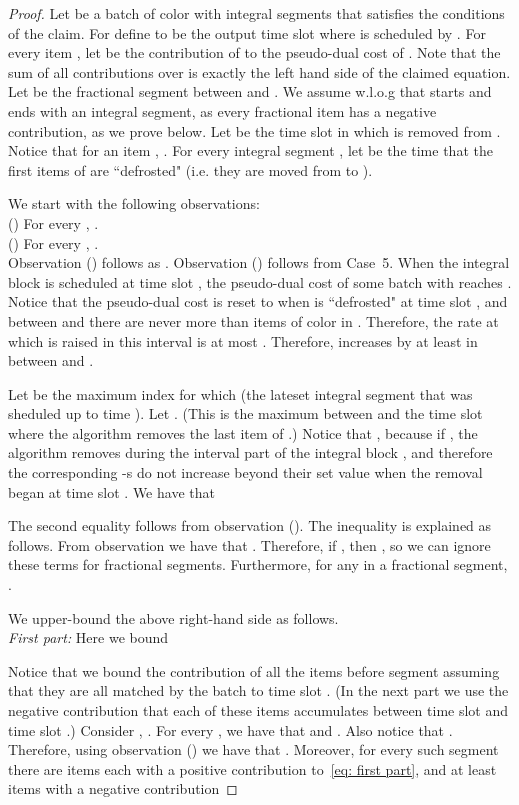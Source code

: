 \documentclass[12pt]{article}
\begin{document}
\begin{proof}
Let  be a batch of color  with  integral segments 
that satisfies the conditions of the claim. For  define 
to be the output time slot where  is scheduled by . For every item , let
 be the contribution of 
to the pseudo-dual cost of . 
Note that the sum of all contributions over  is exactly the left hand 
side of the claimed equation.
Let  be the fractional segment between 
 and . We assume w.l.o.g that  starts and ends with
an integral segment, as every fractional item has a negative contribution,
as we prove below.
Let  be the time slot in which  is removed from .
Notice that for an item , .
For every integral segment , let  be the time that the
first items of  are ``defrosted" (i.e. they are moved from 
to ).

We start with the following observations:\\
() For every , .\\
() For every ,
.\\
Observation () follows as .
Observation () follows from  Case~5. When the integral block 
 is scheduled at time slot , the pseudo-dual cost 
 of some batch  with  reaches .
Notice that the pseudo-dual cost 
is reset to  when  is ``defrosted" at time slot
, and between  and  there are never more
than  items of color  in . Therefore,
the rate at which  is raised in this
interval is at most .
Therefore,  increases by at least  in between 
 and .

Let  be the maximum index for which  
(the lateset integral segment that was sheduled up to time ).
Let . (This is the
maximum between  and the time slot where the algorithm 
removes the last item of .)  Notice that ,
because if , the algorithm removes during the interval 
part of the integral block , and therefore the corresponding 
-s do not increase beyond their set value when the removal 
began at time slot . 
We have that

The second equality follows from observation (). The inequality is
explained as follows. From observation  we have that
.
Therefore, if , then ,
so we can ignore these terms for fractional segments. Furthermore,
for any  in a fractional segment, .

We upper-bound the above right-hand side as follows.\\
{\em First part:}\/ Here we bound

Notice that we bound the contribution of all the items before 
segment  assuming that they are all matched by the batch 
to time slot . (In the next part we use the negative contribution that
each of these items  accumulates between time slot  and time
slot .)
Consider , . For every 
, we have that   and .
Also notice that .
Therefore, using observation () we have that
.
Moreover, for every such segment 
there are  items  each with a positive contribution
 to~\eqref{eq: first part},
and at least  items with a negative 
contribution 


\end{proof}
\end{document}
